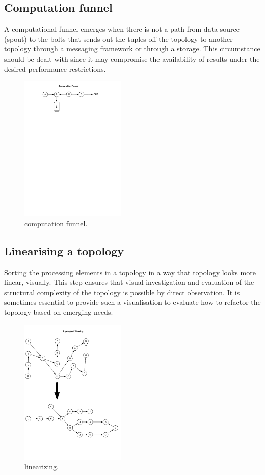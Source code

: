 \subsection{Computation funnel}
A computational funnel emerges when there is not a path from data source (spout) to the bolts that sends out the tuples off the topology to another topology through a messaging framework or through a storage. This circumstance should be dealt with since it may compromise the availability of results under the desired performance restrictions.

\begin{figure}[H]
	\begin{center}
		\includegraphics[width=5cm]{images/funnel}
		\caption{computation funnel.}
		\label{fig:funnel}
	\end{center}
\end{figure}

\subsection{Linearising a topology}

Sorting the processing elements in a topology in a way that topology looks more linear, visually. This step ensures that visual investigation and evaluation of the structural complexity of the topology is possible by direct observation. It is sometimes essential to provide such a visualisation to evaluate how to refactor the topology based on emerging needs.

\begin{figure}[H]
	\begin{center}
		\includegraphics[width=5cm]{images/linearizing}
		\caption{linearizing.}
		\label{fig:linearizing}
	\end{center}
\end{figure}
